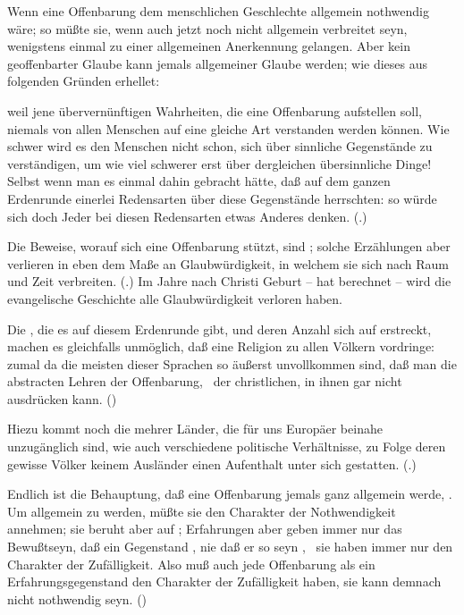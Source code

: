 Wenn eine Offenbarung dem menschlichen Geschlechte allgemein nothwendig wäre; so müßte sie, wenn auch jetzt noch nicht allgemein verbreitet seyn, wenigstens einmal zu einer allgemeinen Anerkennung gelangen. Aber kein geoffenbarter Glaube kann jemals allgemeiner Glaube werden; wie dieses aus folgenden Gründen erhellet:
\begin{aufzb}
\item weil jene übervernünftigen Wahrheiten, die eine Offenbarung aufstellen soll, niemals von allen Menschen auf eine gleiche Art verstanden werden können. Wie schwer wird es den Menschen nicht schon, sich über sinnliche Gegenstände zu verständigen, um wie viel schwerer erst über dergleichen übersinnliche Dinge! Selbst wenn man es einmal dahin gebracht hätte, daß auf dem ganzen Erdenrunde einerlei Redensarten über diese Gegenstände herrschten: so würde sich doch Jeder bei diesen Redensarten etwas Anderes denken. (.)
\item Die Beweise, worauf sich eine Offenbarung stützt, sind ; solche Erzählungen aber verlieren in eben dem Maße an Glaubwürdigkeit, in welchem sie sich nach Raum und Zeit verbreiten. (.) Im Jahre  nach Christi Geburt -- hat  berechnet -- wird die evangelische Geschichte alle Glaubwürdigkeit verloren haben.
\item Die , die es auf diesem Erdenrunde gibt, und deren Anzahl sich auf  erstreckt, machen es gleichfalls unmöglich, daß eine Religion zu allen Völkern vordringe: zumal da die meisten dieser Sprachen so äußerst unvollkommen sind, daß man die abstracten Lehren der Offenbarung, \zB\ der christlichen, in ihnen gar nicht ausdrücken kann. ()
\item Hiezu kommt noch die  mehrer Länder, die für uns Europäer beinahe unzugänglich sind, wie auch verschiedene politische Verhältnisse, zu Folge deren gewisse Völker keinem Ausländer einen Aufenthalt unter sich gestatten. (.)
\item Endlich ist die Behauptung, daß eine Offenbarung jemals ganz allgemein werde, . Um allgemein zu werden, müßte sie den Charakter der Nothwendigkeit annehmen; sie beruht aber auf ; Erfahrungen aber geben immer nur das Bewußtseyn, daß ein Gegenstand , nie daß er so seyn , \dh\ sie haben immer nur den Charakter der Zufälligkeit. Also muß auch jede Offenbarung als ein Erfahrungsgegenstand den Charakter der Zufälligkeit haben, sie kann demnach nicht nothwendig seyn. ()
\end{aufzb}\par

